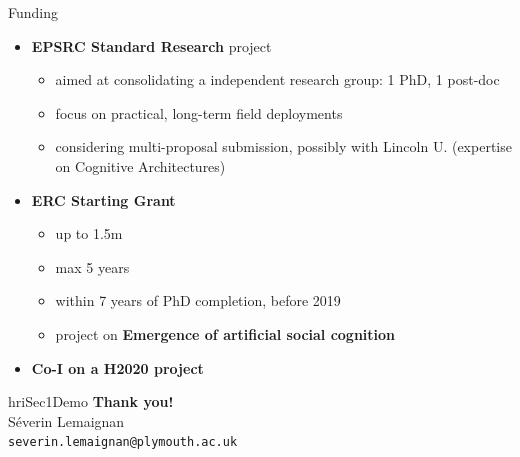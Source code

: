 \documentclass[compress]{beamer}
\begin{document}
\begin{frame}{Funding}
{    \begin{itemize}
        \item {\bf EPSRC Standard Research} project
            \begin{itemize}
                \item aimed at consolidating a independent research group: 1 PhD, 1 post-doc
                \item focus on practical, long-term field deployments
                \item considering multi-proposal submission, possibly with
                    Lincoln U. (expertise on Cognitive Architectures)
            \end{itemize}
        \item {\bf ERC Starting Grant}
            \begin{itemize}
                \item up to \EUR 1.5m
                \item max 5 years
                \item within 7 years of PhD completion, \ie before 2019
                \item project on {\bf Emergence of artificial social cognition}
            \end{itemize}
        \item {\bf Co-I on a H2020 project}
    \end{itemize}
    }

\end{frame}




{
\begin{frame}[plain]

    \vspace{8cm}

\begin{beamercolorbox}[wd=\linewidth,ht=6ex,dp=0.7ex]{hriSec1Demo}
    \textbf{Thank you!}\\
    \scriptsize
    Séverin Lemaignan\\
    {\tt severin.lemaignan@plymouth.ac.uk}
\end{beamercolorbox}
    \vfill
\end{frame}
}
\end{document}
